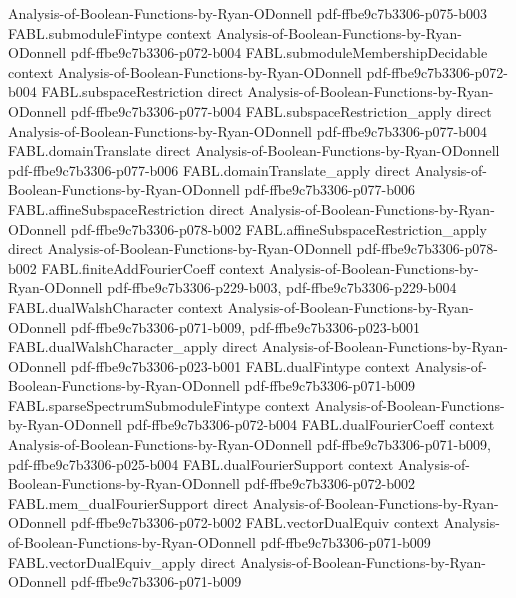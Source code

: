 \begin{theorem}
  {Analysis-of-Boolean-Functions-by-Ryan-ODonnell}
  {pdf-ffbe9c7b3306-p075-b003}
\proofstep
  {FABL.submoduleFintype}
  {context}
  {Analysis-of-Boolean-Functions-by-Ryan-ODonnell}
  {pdf-ffbe9c7b3306-p072-b004}
\proofstep
  {FABL.submoduleMembershipDecidable}
  {context}
  {Analysis-of-Boolean-Functions-by-Ryan-ODonnell}
  {pdf-ffbe9c7b3306-p072-b004}
\proofstep
  {FABL.subspaceRestriction}
  {direct}
  {Analysis-of-Boolean-Functions-by-Ryan-ODonnell}
  {pdf-ffbe9c7b3306-p077-b004}
\proofstep
  {FABL.subspaceRestriction_apply}
  {direct}
  {Analysis-of-Boolean-Functions-by-Ryan-ODonnell}
  {pdf-ffbe9c7b3306-p077-b004}
\proofstep
  {FABL.domainTranslate}
  {direct}
  {Analysis-of-Boolean-Functions-by-Ryan-ODonnell}
  {pdf-ffbe9c7b3306-p077-b006}
\proofstep
  {FABL.domainTranslate_apply}
  {direct}
  {Analysis-of-Boolean-Functions-by-Ryan-ODonnell}
  {pdf-ffbe9c7b3306-p077-b006}
\proofstep
  {FABL.affineSubspaceRestriction}
  {direct}
  {Analysis-of-Boolean-Functions-by-Ryan-ODonnell}
  {pdf-ffbe9c7b3306-p078-b002}
\proofstep
  {FABL.affineSubspaceRestriction_apply}
  {direct}
  {Analysis-of-Boolean-Functions-by-Ryan-ODonnell}
  {pdf-ffbe9c7b3306-p078-b002}
\proofstep
  {FABL.finiteAddFourierCoeff}
  {context}
  {Analysis-of-Boolean-Functions-by-Ryan-ODonnell}
  {pdf-ffbe9c7b3306-p229-b003,
    pdf-ffbe9c7b3306-p229-b004}
\proofstep
  {FABL.dualWalshCharacter}
  {context}
  {Analysis-of-Boolean-Functions-by-Ryan-ODonnell}
  {pdf-ffbe9c7b3306-p071-b009,
    pdf-ffbe9c7b3306-p023-b001}
\proofstep
  {FABL.dualWalshCharacter_apply}
  {direct}
  {Analysis-of-Boolean-Functions-by-Ryan-ODonnell}
  {pdf-ffbe9c7b3306-p023-b001}
\proofstep
  {FABL.dualFintype}
  {context}
  {Analysis-of-Boolean-Functions-by-Ryan-ODonnell}
  {pdf-ffbe9c7b3306-p071-b009}
\proofstep
  {FABL.sparseSpectrumSubmoduleFintype}
  {context}
  {Analysis-of-Boolean-Functions-by-Ryan-ODonnell}
  {pdf-ffbe9c7b3306-p072-b004}
\proofstep
  {FABL.dualFourierCoeff}
  {context}
  {Analysis-of-Boolean-Functions-by-Ryan-ODonnell}
  {pdf-ffbe9c7b3306-p071-b009,
    pdf-ffbe9c7b3306-p025-b004}
\proofstep
  {FABL.dualFourierSupport}
  {context}
  {Analysis-of-Boolean-Functions-by-Ryan-ODonnell}
  {pdf-ffbe9c7b3306-p072-b002}
\proofstep
  {FABL.mem_dualFourierSupport}
  {direct}
  {Analysis-of-Boolean-Functions-by-Ryan-ODonnell}
  {pdf-ffbe9c7b3306-p072-b002}
\proofstep
  {FABL.vectorDualEquiv}
  {context}
  {Analysis-of-Boolean-Functions-by-Ryan-ODonnell}
  {pdf-ffbe9c7b3306-p071-b009}
\proofstep
  {FABL.vectorDualEquiv_apply}
  {direct}
  {Analysis-of-Boolean-Functions-by-Ryan-ODonnell}
  {pdf-ffbe9c7b3306-p071-b009}

\end{theorem}
